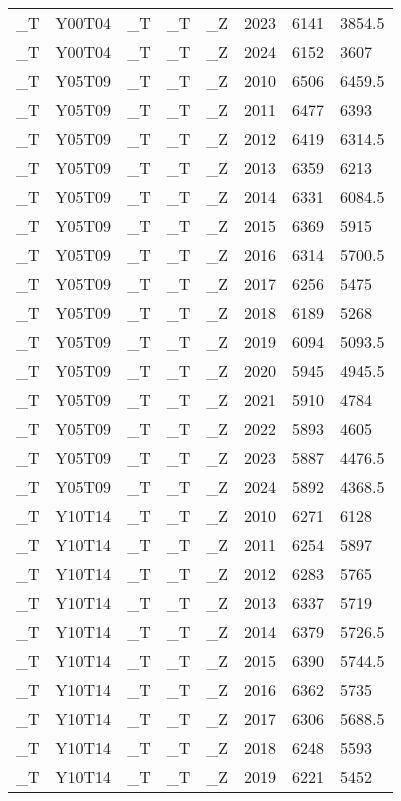 \begin{longtable}[t]{llllllll}
\_T & Y00T04 & \_T & \_T & \_Z & 2023 & 6141 & 3854.5\\
\_T & Y00T04 & \_T & \_T & \_Z & 2024 & 6152 & 3607\\
\addlinespace
\_T & Y05T09 & \_T & \_T & \_Z & 2010 & 6506 & 6459.5\\
\_T & Y05T09 & \_T & \_T & \_Z & 2011 & 6477 & 6393\\
\_T & Y05T09 & \_T & \_T & \_Z & 2012 & 6419 & 6314.5\\
\_T & Y05T09 & \_T & \_T & \_Z & 2013 & 6359 & 6213\\
\_T & Y05T09 & \_T & \_T & \_Z & 2014 & 6331 & 6084.5\\
\addlinespace
\_T & Y05T09 & \_T & \_T & \_Z & 2015 & 6369 & 5915\\
\_T & Y05T09 & \_T & \_T & \_Z & 2016 & 6314 & 5700.5\\
\_T & Y05T09 & \_T & \_T & \_Z & 2017 & 6256 & 5475\\
\_T & Y05T09 & \_T & \_T & \_Z & 2018 & 6189 & 5268\\
\_T & Y05T09 & \_T & \_T & \_Z & 2019 & 6094 & 5093.5\\
\addlinespace
\_T & Y05T09 & \_T & \_T & \_Z & 2020 & 5945 & 4945.5\\
\_T & Y05T09 & \_T & \_T & \_Z & 2021 & 5910 & 4784\\
\_T & Y05T09 & \_T & \_T & \_Z & 2022 & 5893 & 4605\\
\_T & Y05T09 & \_T & \_T & \_Z & 2023 & 5887 & 4476.5\\
\_T & Y05T09 & \_T & \_T & \_Z & 2024 & 5892 & 4368.5\\
\addlinespace
\_T & Y10T14 & \_T & \_T & \_Z & 2010 & 6271 & 6128\\
\_T & Y10T14 & \_T & \_T & \_Z & 2011 & 6254 & 5897\\
\_T & Y10T14 & \_T & \_T & \_Z & 2012 & 6283 & 5765\\
\_T & Y10T14 & \_T & \_T & \_Z & 2013 & 6337 & 5719\\
\_T & Y10T14 & \_T & \_T & \_Z & 2014 & 6379 & 5726.5\\
\addlinespace
\_T & Y10T14 & \_T & \_T & \_Z & 2015 & 6390 & 5744.5\\
\_T & Y10T14 & \_T & \_T & \_Z & 2016 & 6362 & 5735\\
\_T & Y10T14 & \_T & \_T & \_Z & 2017 & 6306 & 5688.5\\
\_T & Y10T14 & \_T & \_T & \_Z & 2018 & 6248 & 5593\\
\_T & Y10T14 & \_T & \_T & \_Z & 2019 & 6221 & 5452\\

\end{longtable}
